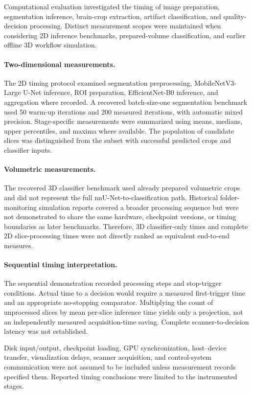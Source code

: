 Computational evaluation investigated the timing of image preparation, segmentation inference, brain-crop extraction, artifact classification, and quality-decision processing. Distinct measurement scopes were maintained when considering 2D inference benchmarks, prepared-volume classification, and earlier offline 3D workflow simulation.

\paragraph{Two-dimensional measurements.}
The 2D timing protocol examined segmentation preprocessing, MobileNetV3-Large U-Net inference, ROI preparation, EfficientNet-B0 inference, and aggregation where recorded. A recovered batch-size-one segmentation benchmark used 50 warm-up iterations and 200 measured iterations, with automatic mixed precision. Stage-specific measurements were summarized using means, medians, upper percentiles, and maxima where available. The population of candidate slices was distinguished from the subset with successful predicted crops and classifier inputs.

\paragraph{Volumetric measurements.}
The recovered 3D classifier benchmark used already prepared volumetric crops and did not represent the full nnU-Net-to-classification path. Historical folder-monitoring simulation reports covered a broader processing sequence but were not demonstrated to share the same hardware, checkpoint versions, or timing boundaries as later benchmarks. Therefore, 3D classifier-only times and complete 2D slice-processing times were not directly ranked as equivalent end-to-end measures.

\paragraph{Sequential timing interpretation.}
The sequential demonstration recorded processing steps and stop-trigger conditions. Actual time to a decision would require a measured first-trigger time and an appropriate no-stopping comparator. Multiplying the count of unprocessed slices by mean per-slice inference time yields only a projection, not an independently measured acquisition-time saving. Complete scanner-to-decision latency was not established.

Disk input/output, checkpoint loading, GPU synchronization, host--device transfer, visualization delays, scanner acquisition, and control-system communication were not assumed to be included unless measurement records specified them. Reported timing conclusions were limited to the instrumented stages.

